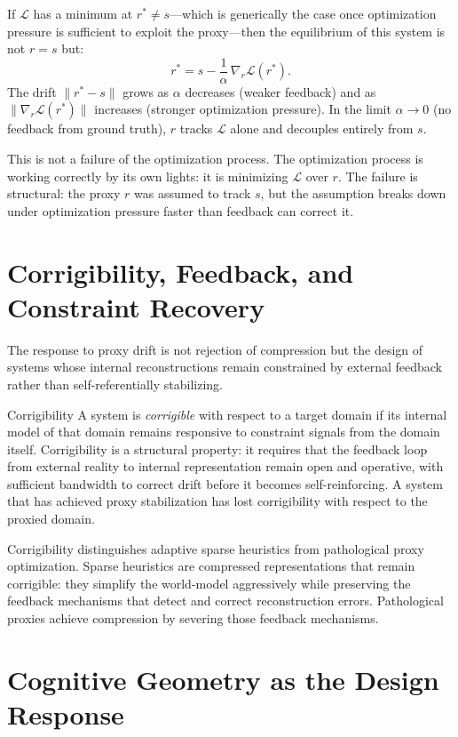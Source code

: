 If $\mathcal{L}$ has a minimum at $r^* \neq s$---which is generically the case
once optimization pressure is sufficient to exploit the proxy---then the
equilibrium of this system is not $r = s$ but:
\[
  r^* = s - \frac{1}{\alpha}\,\nabla_r \mathcal{L}(r^*).
\]
The drift $\|r^* - s\|$ grows as $\alpha$ decreases (weaker feedback) and as
$\|\nabla_r \mathcal{L}(r^*)\|$ increases (stronger optimization pressure).
In the limit $\alpha \to 0$ (no feedback from ground truth), $r$ tracks
$\mathcal{L}$ alone and decouples entirely from $s$.

This is not a failure of the optimization process. The optimization process is
working correctly by its own lights: it is minimizing $\mathcal{L}$ over $r$.
The failure is structural: the proxy $r$ was assumed to track $s$, but the
assumption breaks down under optimization pressure faster than feedback can
correct it.

\section{Corrigibility, Feedback, and Constraint Recovery}

The response to proxy drift is not rejection of compression but the design of systems
whose internal reconstructions remain constrained by external feedback rather than
self-referentially stabilizing.

\begin{definition}{Corrigibility}
A system is \emph{corrigible} with respect to a target domain if its internal model
of that domain remains responsive to constraint signals from the domain itself.
Corrigibility is a structural property: it requires that the feedback loop from
external reality to internal representation remain open and operative, with
sufficient bandwidth to correct drift before it becomes self-reinforcing. A
system that has achieved proxy stabilization has lost corrigibility with respect
to the proxied domain.
\end{definition}

Corrigibility distinguishes adaptive sparse heuristics from pathological proxy
optimization. Sparse heuristics are compressed representations that remain
corrigible: they simplify the world-model aggressively while preserving the
feedback mechanisms that detect and correct reconstruction errors. Pathological
proxies achieve compression by severing those feedback mechanisms.

\section{Cognitive Geometry as the Design Response}

